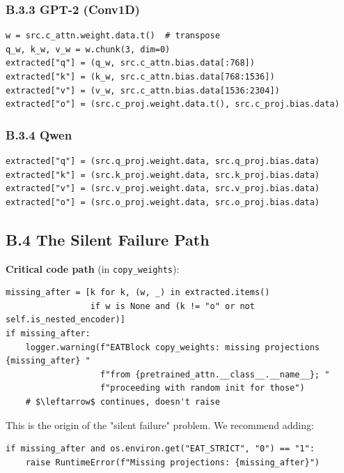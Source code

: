 \subsubsection{B.3.3 GPT-2 (Conv1D)}

\begin{lstlisting}
w = src.c_attn.weight.data.t()  # transpose
q_w, k_w, v_w = w.chunk(3, dim=0)
extracted["q"] = (q_w, src.c_attn.bias.data[:768])
extracted["k"] = (k_w, src.c_attn.bias.data[768:1536])
extracted["v"] = (v_w, src.c_attn.bias.data[1536:2304])
extracted["o"] = (src.c_proj.weight.data.t(), src.c_proj.bias.data)
\end{lstlisting}

\subsubsection{B.3.4 Qwen}

\begin{lstlisting}
extracted["q"] = (src.q_proj.weight.data, src.q_proj.bias.data)
extracted["k"] = (src.k_proj.weight.data, src.k_proj.bias.data)
extracted["v"] = (src.v_proj.weight.data, src.v_proj.bias.data)
extracted["o"] = (src.o_proj.weight.data, src.o_proj.bias.data)
\end{lstlisting}

\subsection{B.4 The Silent Failure Path}

\textbf{Critical code path} (in \texttt{copy\_weights}):

\begin{lstlisting}
missing_after = [k for k, (w, _) in extracted.items() 
                 if w is None and (k != "o" or not self.is_nested_encoder)]
if missing_after:
    logger.warning(f"EATBlock copy_weights: missing projections {missing_after} "
                   f"from {pretrained_attn.__class__.__name__}; "
                   f"proceeding with random init for those")
    # $\leftarrow$ continues, doesn't raise
\end{lstlisting}

This is the origin of the "silent failure" problem. We recommend adding:

\begin{lstlisting}
if missing_after and os.environ.get("EAT_STRICT", "0") == "1":
    raise RuntimeError(f"Missing projections: {missing_after}")
\end{lstlisting}

